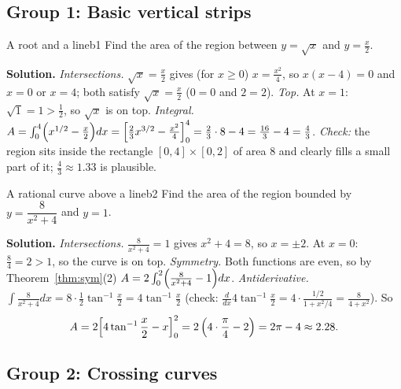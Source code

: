 \documentclass[11pt]{article}
\begin{document}
\subsection*{Group 1: Basic vertical strips}

\begin{exmp}{A root and a line}{b1}
Find the area of the region between $y=\sqrt x$ and $y=\frac x2$.

\textbf{Solution.} \emph{Intersections.} $\sqrt x=\frac x2$ gives (for $x\ge0$) $x=\frac{x^2}4$, so $x(x-4)=0$ and $x=0$ or $x=4$; both satisfy $\sqrt x=\frac x2$ ($0=0$ and $2=2$). \emph{Top.} At $x=1$: $\sqrt1=1>\frac12$, so $\sqrt x$ is on top.
\emph{Integral.} $A=\int_0^4\Bigl(x^{1/2}-\frac x2\Bigr)dx=\Bigl[\frac23x^{3/2}-\frac{x^2}4\Bigr]_0^4=\frac23\cdot8-4=\frac{16}3-4=\frac43$.
\emph{Check:} the region sits inside the rectangle $[0,4]\times[0,2]$ of area $8$ and clearly fills a small part of it; $\frac43\approx1.33$ is plausible.
\end{exmp}

\begin{exmp}{A rational curve above a line}{b2}
Find the area of the region bounded by $y=\dfrac8{x^2+4}$ and $y=1$.

\textbf{Solution.} \emph{Intersections.} $\frac8{x^2+4}=1$ gives $x^2+4=8$, so $x=\pm2$. At $x=0$: $\frac84=2>1$, so the curve is on top. \emph{Symmetry.} Both functions are even, so by Theorem~\ref{thm:sym}(2) $A=2\int_0^2\Bigl(\frac8{x^2+4}-1\Bigr)dx$.
\emph{Antiderivative.} $\int\frac8{x^2+4}dx=8\cdot\frac12\tan^{-1}\frac x2=4\tan^{-1}\frac x2$ (check: $\frac d{dx}4\tan^{-1}\frac x2=4\cdot\frac{1/2}{1+x^2/4}=\frac8{4+x^2}$). So
\[
A=2\Bigl[4\tan^{-1}\frac x2-x\Bigr]_0^2=2\left(4\cdot\frac\pi4-2\right)=2\pi-4\approx2.28 .
\]
\end{exmp}

\subsection*{Group 2: Crossing curves}
\end{document}
